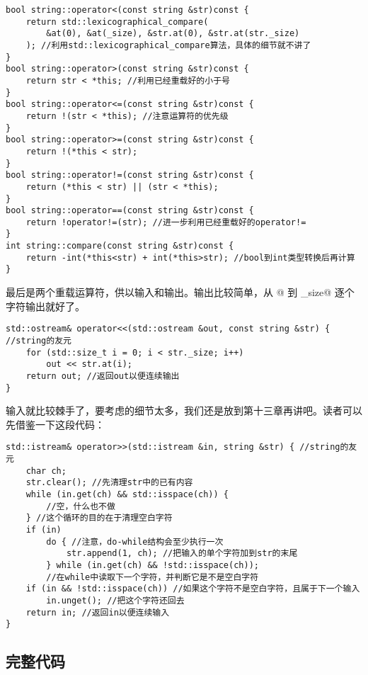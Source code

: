 \begin{lstlisting}
bool string::operator<(const string &str)const {
    return std::lexicographical_compare(
        &at(0), &at(_size), &str.at(0), &str.at(str._size)
    ); //利用std::lexicographical_compare算法，具体的细节就不讲了
}
bool string::operator>(const string &str)const {
    return str < *this; //利用已经重载好的小于号
}
bool string::operator<=(const string &str)const {
    return !(str < *this); //注意运算符的优先级
}
bool string::operator>=(const string &str)const {
    return !(*this < str);
}
bool string::operator!=(const string &str)const {
    return (*this < str) || (str < *this);
}
bool string::operator==(const string &str)const {
    return !operator!=(str); //进一步利用已经重载好的operator!=
}
int string::compare(const string &str)const {
    return -int(*this<str) + int(*this>str); //bool到int类型转换后再计算
}
\end{lstlisting}\par
最后是两个重载运算符，供以输入和输出。输出比较简单，从 @ 到 \lstinline@_size@ 逐个字符输出就好了。
\begin{lstlisting}
std::ostream& operator<<(std::ostream &out, const string &str) { //string的友元
    for (std::size_t i = 0; i < str._size; i++)
        out << str.at(i);
    return out; //返回out以便连续输出
}
\end{lstlisting}
输入就比较棘手了，要考虑的细节太多，我们还是放到第十三章再讲吧。读者可以先借鉴一下这段代码：
\begin{lstlisting}
std::istream& operator>>(std::istream &in, string &str) { //string的友元
    char ch;
    str.clear(); //先清理str中的已有内容
    while (in.get(ch) && std::isspace(ch)) {
        //空，什么也不做
    } //这个循环的目的在于清理空白字符
    if (in)
        do { //注意，do-while结构会至少执行一次
            str.append(1, ch); //把输入的单个字符加到str的末尾
        } while (in.get(ch) && !std::isspace(ch));
        //在while中读取下一个字符，并判断它是不是空白字符
    if (in && !std::isspace(ch)) //如果这个字符不是空白字符，且属于下一个输入
        in.unget(); //把这个字符还回去
    return in; //返回in以便连续输入
}
\end{lstlisting}\par
\subsection*{完整代码}

